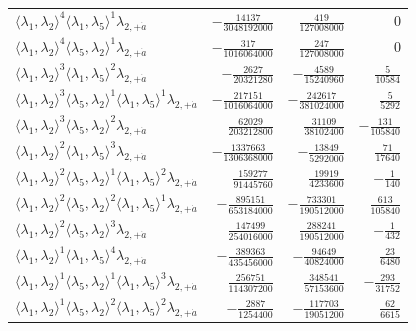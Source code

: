 \begin{longtable}{@{}lrrr@{}}
$\langle\lambda_1,\lambda_2\rangle^{4}\langle\lambda_1,\lambda_5\rangle^{1}\lambda_{2,+\dot a}$ & $-\frac{14137}{3048192000}$ & $\frac{419}{127008000}$ & $0$ \\
$\langle\lambda_1,\lambda_2\rangle^{4}\langle\lambda_5,\lambda_2\rangle^{1}\lambda_{2,+\dot a}$ & $-\frac{317}{1016064000}$ & $\frac{247}{127008000}$ & $0$ \\
$\langle\lambda_1,\lambda_2\rangle^{3}\langle\lambda_1,\lambda_5\rangle^{2}\lambda_{2,+\dot a}$ & $-\frac{2627}{20321280}$ & $-\frac{4589}{15240960}$ & $\frac{5}{10584}$ \\
$\langle\lambda_1,\lambda_2\rangle^{3}\langle\lambda_5,\lambda_2\rangle^{1}\langle\lambda_1,\lambda_5\rangle^{1}\lambda_{2,+\dot a}$ & $-\frac{217151}{1016064000}$ & $-\frac{242617}{381024000}$ & $\frac{5}{5292}$ \\
$\langle\lambda_1,\lambda_2\rangle^{3}\langle\lambda_5,\lambda_2\rangle^{2}\lambda_{2,+\dot a}$ & $\frac{62029}{203212800}$ & $\frac{31109}{38102400}$ & $-\frac{131}{105840}$ \\
$\langle\lambda_1,\lambda_2\rangle^{2}\langle\lambda_1,\lambda_5\rangle^{3}\lambda_{2,+\dot a}$ & $-\frac{1337663}{1306368000}$ & $-\frac{13849}{5292000}$ & $\frac{71}{17640}$ \\
$\langle\lambda_1,\lambda_2\rangle^{2}\langle\lambda_5,\lambda_2\rangle^{1}\langle\lambda_1,\lambda_5\rangle^{2}\lambda_{2,+\dot a}$ & $\frac{159277}{91445760}$ & $\frac{19919}{4233600}$ & $-\frac{1}{140}$ \\
$\langle\lambda_1,\lambda_2\rangle^{2}\langle\lambda_5,\lambda_2\rangle^{2}\langle\lambda_1,\lambda_5\rangle^{1}\lambda_{2,+\dot a}$ & $-\frac{895151}{653184000}$ & $-\frac{733301}{190512000}$ & $\frac{613}{105840}$ \\
$\langle\lambda_1,\lambda_2\rangle^{2}\langle\lambda_5,\lambda_2\rangle^{3}\lambda_{2,+\dot a}$ & $\frac{147499}{254016000}$ & $\frac{288241}{190512000}$ & $-\frac{1}{432}$ \\
$\langle\lambda_1,\lambda_2\rangle^{1}\langle\lambda_1,\lambda_5\rangle^{4}\lambda_{2,+\dot a}$ & $-\frac{389363}{435456000}$ & $-\frac{94649}{40824000}$ & $\frac{23}{6480}$ \\
$\langle\lambda_1,\lambda_2\rangle^{1}\langle\lambda_5,\lambda_2\rangle^{1}\langle\lambda_1,\lambda_5\rangle^{3}\lambda_{2,+\dot a}$ & $\frac{256751}{114307200}$ & $\frac{348541}{57153600}$ & $-\frac{293}{31752}$ \\
$\langle\lambda_1,\lambda_2\rangle^{1}\langle\lambda_5,\lambda_2\rangle^{2}\langle\lambda_1,\lambda_5\rangle^{2}\lambda_{2,+\dot a}$ & $-\frac{2887}{1254400}$ & $-\frac{117703}{19051200}$ & $\frac{62}{6615}$ \\

\end{longtable}
